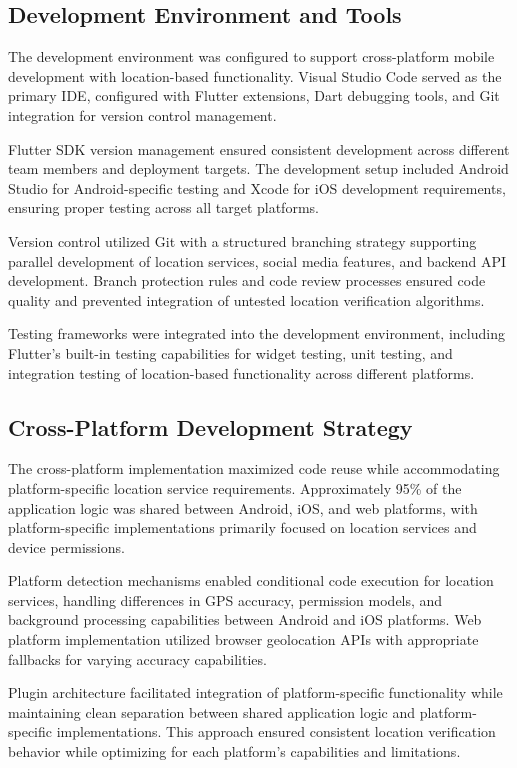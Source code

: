 \subsection{Development Environment and Tools}
\label{subsec:dev-environment}

The development environment was configured to support cross-platform mobile development with location-based functionality. Visual Studio Code served as the primary IDE, configured with Flutter extensions, Dart debugging tools, and Git integration for version control management.

Flutter SDK version management ensured consistent development across different team members and deployment targets. The development setup included Android Studio for Android-specific testing and Xcode for iOS development requirements, ensuring proper testing across all target platforms.

Version control utilized Git with a structured branching strategy supporting parallel development of location services, social media features, and backend API development. Branch protection rules and code review processes ensured code quality and prevented integration of untested location verification algorithms.

Testing frameworks were integrated into the development environment, including Flutter's built-in testing capabilities for widget testing, unit testing, and integration testing of location-based functionality across different platforms.

\subsection{Cross-Platform Development Strategy}
\label{subsec:cross-platform-strategy}

The cross-platform implementation maximized code reuse while accommodating platform-specific location service requirements. Approximately 95\% of the application logic was shared between Android, iOS, and web platforms, with platform-specific implementations primarily focused on location services and device permissions.

Platform detection mechanisms enabled conditional code execution for location services, handling differences in GPS accuracy, permission models, and background processing capabilities between Android and iOS platforms. Web platform implementation utilized browser geolocation APIs with appropriate fallbacks for varying accuracy capabilities.

Plugin architecture facilitated integration of platform-specific functionality while maintaining clean separation between shared application logic and platform-specific implementations. This approach ensured consistent location verification behavior while optimizing for each platform's capabilities and limitations.

